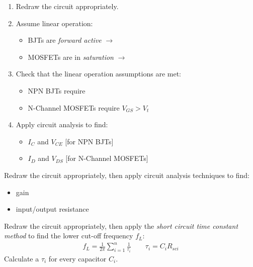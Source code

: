 \begin{CheatsheetEntryFrame}
    \begin{MulticolsSoftSepRule}{2}

        \begin{enumerate}
            \item Redraw the circuit appropriately.
            \item Assume linear operation:
            \begin{itemize}
                \item BJTs are \emph{forward active} $\to$ \Todo{}
                \item MOSFETs are in \emph{saturation} $\to$ \Todo{}
            \end{itemize}
            \item Check that the linear operation assumptions are met:
            \begin{itemize}
                \item NPN BJTs require 
                \item N-Channel MOSFETs require $V_{GS} > V_t$
            \end{itemize}
            \item Apply circuit analysis to find:
            \begin{itemize}
                \item $I_C$ and $V_{CE}$ {\footnotesize {}[for NPN BJTs]}
                \item $I_D$ and $V_{DS}$ {\footnotesize {}[for N-Channel MOSFETs]}
            \end{itemize}
        \end{enumerate}

        \bigskip
        \SoftHLine
        \bigskip


        Redraw the circuit appropriately, then apply circuit analysis techniques to find:
        \begin{itemize}
            \item gain
            \item input/output resistance
        \end{itemize}

        \MulticolsBreak


        Redraw the circuit appropriately, then apply the \linebreak \emph{short circuit time constant method} to find the \linebreak lower cut-off frequency $f_L$:
        \begin{gather*}
            f_L
            = \frac{1}{2 \pi}
            \sum_{i=1}^n \frac{1}{\tau_i}
            \qquad
            \tau_i = C_i R_{sci}
        \end{gather*}
        Calculate a $\tau_i$ for every capacitor $C_i$.


\end{MulticolsSoftSepRule}
\end{CheatsheetEntryFrame}
